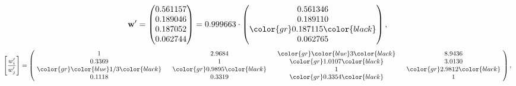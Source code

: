\begin{example}
\begin{equation*}
\mathbf{w}^{\prime} =
\begin{pmatrix}
0.561157\\
0.189046\\
0.187052\\
0.062744
\end{pmatrix} =
0.999663\cdot
\begin{pmatrix}
0.561346\\
0.189110\\
\color{gr} 0.187115\color{black} \\
0.062765
\end{pmatrix},
\end{equation*}
\begin{equation*}
\left[ \frac{{w}^{\prime}_i}{{w}^{\prime}_j} \right] =
\begin{pmatrix}
$\,\,$ 1 $\,\,$ & $\,\,$2.9684$\,\,$ & $\,\,$\color{gr} \color{blue} 3\color{black} $\,\,$ & $\,\,$8.9436$\,\,$ \\
$\,\,$0.3369$\,\,$ & $\,\,$ 1 $\,\,$ & $\,\,$\color{gr} 1.0107\color{black} $\,\,$ & $\,\,$3.0130  $\,\,$ \\
$\,\,$\color{gr} \color{blue}  1/3\color{black} $\,\,$ & $\,\,$\color{gr} 0.9895\color{black} $\,\,$ & $\,\,$ 1 $\,\,$ & $\,\,$\color{gr} 2.9812\color{black}  $\,\,$ \\
$\,\,$0.1118$\,\,$ & $\,\,$0.3319$\,\,$ & $\,\,$\color{gr} 0.3354\color{black} $\,\,$ & $\,\,$ 1  $\,\,$ \\
\end{pmatrix},
\end{equation*}
\end{example}
\newpage
